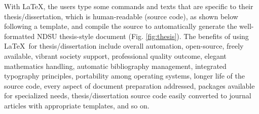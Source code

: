 \documentclass[letterpaper]{refart}
\begin{document}
With \LaTeX, the users type some commands and texts that are specific to their thesis/dissertation, which is human-readable (source code), as shown below following a template, and compile the source to automatically generate the well-formatted NDSU thesis-style document (Fig. \ref{fig:thesis}). The benefits of using \LaTeX\ for thesis/dissertation include overall automation, open-source, freely available, vibrant society support, professional quality outcome, elegant mathematics handling, automatic bibliography management, integrated typography principles, portability among operating systems, longer life of the source code, every aspect of document preparation addressed, packages available for specialized needs, thesis/dissertation source code easily converted to journal articles with appropriate templates, and so on.        
\end{document}

